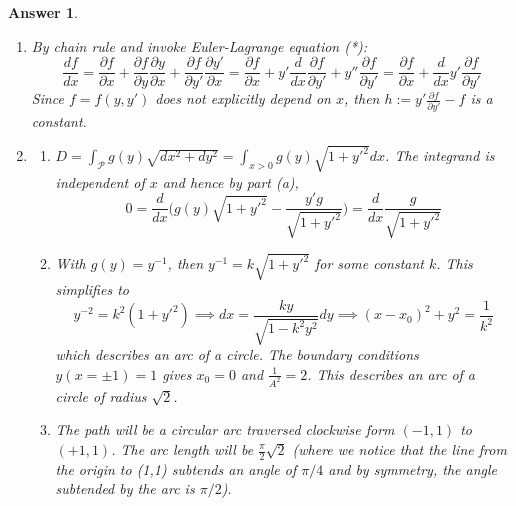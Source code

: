 \documentclass[a4paper]{article}
\newtheorem{ans}{Answer}[section]
\theoremstyle{new}
\begin{document}
\begin{ans}\leavevmode
\begin{enumerate}[label=(\alph*)]
\item By chain rule and invoke Euler-Lagrange equation (*):
$$\frac{df}{dx}=\frac{\partial f}{\partial x}+\frac{\partial f}{\partial y}\frac{\partial y}{\partial x}+\frac{\partial f}{\partial y'}\frac{\partial y'}{\partial x}=\frac{\partial f}{\partial x}+y'\frac{d}{dx}\frac{\partial f}{\partial y'}+y''\frac{\partial f}{\partial y'}=\frac{\partial f}{\partial x}+\frac{d}{dx}y'\frac{\partial f}{\partial y'}$$
Since $f=f(y,y')$ does not explicitly depend on $x$, then $h:=y'\frac{\partial f}{\partial y'}-f$ is a constant.
\item
\begin{enumerate}[label=(\roman*)]
\item
$D=\int_{\mathcal{P}}g(y)\sqrt{dx^2+dy^2}=\int_{x>0}g(y)\sqrt{1+y'^2}dx$. The integrand is independent of $x$ and hence by part (a),
$$0=\frac{d}{dx}\bigg(g(y)\sqrt{1+y'^2}-\frac{y'g}{\sqrt{1+y'^2}}\bigg)=\frac{d}{dx}\frac{g}{\sqrt{1+y'^2}}$$
\item With $g(y)=y^{-1}$, then $y^{-1}=k\sqrt{1+y'^2}$ for some constant $k$. This simplifies to
$$y^{-2}=k^2(1+y'^2)\implies dx=\frac{ky}{\sqrt{1-k^2y^2}}dy\implies(x-x_0)^2+y^2=\frac{1}{k^2}$$
which describes an arc of a circle. The boundary conditions $y(x=\pm 1)=1$ gives $x_0=0$ and $\frac{1}{A^2}=2$. This describes an arc of a circle of radius $\sqrt{2}$.
\item The path will be a circular arc traversed clockwise form $(-1,1)$ to $(+1,1)$. The arc length will be $\frac{\pi}{2}\sqrt{2}$ (where we notice that the line from the origin to (1,1) subtends an angle of $\pi/4$ and by symmetry, the angle subtended by the arc is $\pi/2$).
\end{enumerate}
\end{enumerate}
\end{ans}
\newpage
\end{document}

